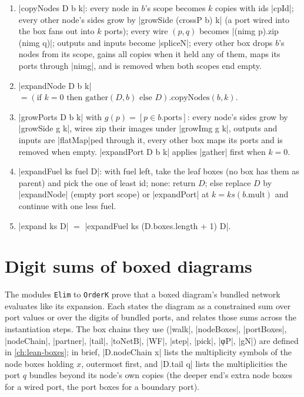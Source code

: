 \begin{algorithm}\label{alg:lean-core-expand}
\begin{enumerate}
\item \lean|copyNodes D b k|: every node in $b$'s scope becomes $k$ copies with ids \lean|cpId|; every
  other node's sides grow by \lean|growSide (crossP b) k| (a port wired into the box fans out into
  $k$ ports); every wire $(p,q)$ becomes \lean|(nimg p).zip (nimg q)|; outputs and inputs become
  \lean|spliceN|; every other box drops $b$'s nodes from its scope, gains all copies when it held any
  of them, maps its ports through \lean|nimg|, and is removed when both scopes end empty.
\item \lean|expandNode D b k| $=(\text{if }k=0\text{ then gather}(D,b)\text{ else }D).\mathrm{copyNodes}(b,k)$.
\item \lean|growPorts D b k| with $g(p)=[p\in b.\mathrm{ports}]$: every node's sides grow by
  \lean|growSide g k|, wires zip their images under \lean|growImg g k|, outputs and inputs are
  \lean|flatMap|ped through it, every other box maps its ports and is removed when empty.
  \lean|expandPort D b k| applies \lean|gather| first when $k=0$.
\item \lean|expandFuel ks fuel D|: with fuel left, take the leaf boxes (no box has them as parent)
  and pick the one of least id; none: return $D$; else replace $D$ by \lean|expandNode| (empty port
  scope) or \lean|expandPort| at $k=ks(b.\mathrm{mult})$ and continue with one less fuel.
\item \lean|expand ks D| $=$ \lean|expandFuel ks (D.boxes.length + 1) D|.
\end{enumerate}
\end{algorithm}

\section{Digit sums of boxed diagrams}\label{sec:lean-core-digits}

The modules \texttt{Elim} to \texttt{OrderK} prove that a boxed diagram's bundled network evaluates
like its expansion. Each states the diagram as a constrained sum over port values or over the digits
of bundled ports, and relates those sums across the instantiation steps. The box chains they use
(\lean|walk|, \lean|nodeBoxes|, \lean|portBoxes|, \lean|nodeChain|, \lean|partner|, \lean|tail|,
\lean|toNetB|, \lean|WF|, \lean|step|, \lean|pick|, \leanLLone|φP|, \lean|gN|) are defined in
\cref{ch:lean-boxes}; in brief, \lean|D.nodeChain x| lists the multiplicity symbols of the node boxes
holding $x$, outermost first, and \lean|D.tail q| lists the multiplicities the port $q$ bundles
beyond its node's own copies (the deeper end's extra node boxes for a wired port, the port boxes for
a boundary port).

